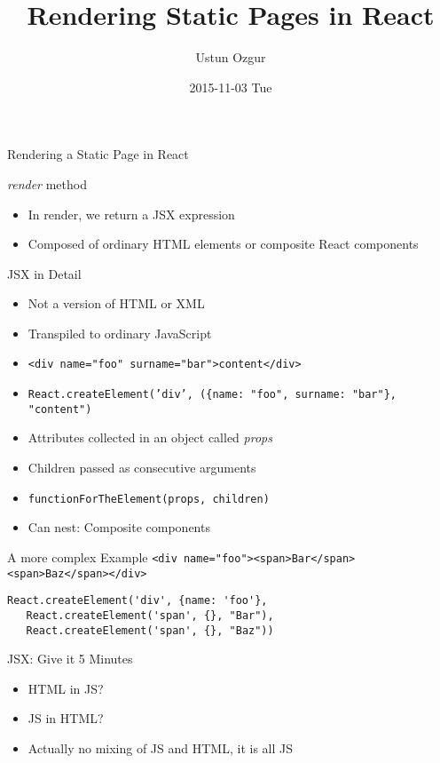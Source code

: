\documentclass[presentation]{beamer}
\author{Ustun Ozgur}
\date{2015-11-03 Tue}
\title{Rendering Static Pages in React}
\begin{document}
\maketitle

\begin{frame}[label={sec:orgheadline1}]{Rendering a Static Page in React}
\begin{block}{\emph{render} method}
\begin{itemize}
\item In render, we return a JSX expression
\item Composed of ordinary HTML elements or composite React components
\end{itemize}
\end{block}
\end{frame}

\begin{frame}[fragile,label={sec:orgheadline2}]{JSX in Detail}
 \begin{itemize}
\item Not a version of HTML or XML
\item Transpiled to ordinary JavaScript
\item \texttt{<div name="foo" surname="bar">content</div>}
\item \texttt{React.createElement('div', (\{name: "foo", surname: "bar"\}, "content")}
\item Attributes collected in an object called \emph{props}
\item Children passed as consecutive arguments
\item \texttt{functionForTheElement(props, children)}
\item Can nest: Composite components
\end{itemize}
\end{frame}

\begin{frame}[fragile,label={sec:orgheadline3}]{A more complex Example}
 \texttt{<div name="foo"><span>Bar</span><span>Baz</span></div>}

\begin{verbatim}
React.createElement('div', {name: 'foo'},
   React.createElement('span', {}, "Bar"),
   React.createElement('span', {}, "Baz"))
\end{verbatim}
\end{frame}

\begin{frame}[label={sec:orgheadline4}]{JSX: Give it 5 Minutes}
\begin{itemize}
\item HTML in JS?
\item JS in HTML?
\item Actually no mixing of JS and HTML, it is all JS
\end{itemize}
\end{frame}
\end{document}
